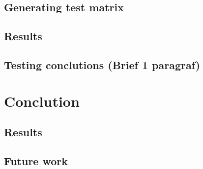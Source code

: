 \documentclass[a4paper, 12pt]{article}
\begin{document}
    \subsection{Generating test matrix}
    \subsection{Results}
    \subsection{Testing conclutions (Brief 1 paragraf)}
    
    \section{Conclution}
    \subsection{Results}
    \subsection{Future work}





    \newpage
     
	
\end{document}

